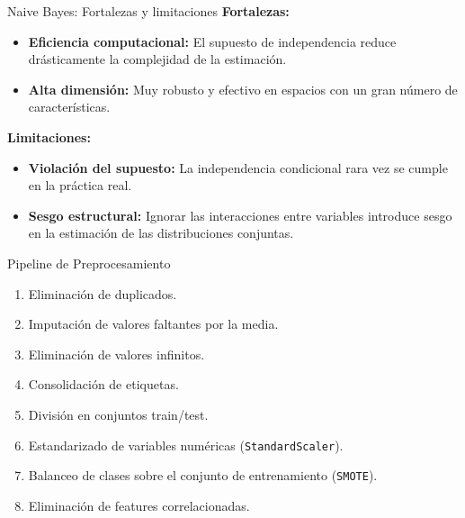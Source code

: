 \documentclass{beamer}
\begin{document}
\begin{frame}{Naive Bayes: Fortalezas y limitaciones}
    \textbf{Fortalezas:}
    \begin{itemize}
        \item \textbf{Eficiencia computacional:} El supuesto de independencia reduce drásticamente la complejidad de la estimación.
        
        \item \textbf{Alta dimensión:} Muy robusto y efectivo en espacios con un gran número de características.
    \end{itemize}
    
    \vspace{0.2cm}
    
    \textbf{Limitaciones:}
    \begin{itemize}
        \item \textbf{Violación del supuesto:} La independencia condicional rara vez se cumple en la práctica real.
        
        \item \textbf{Sesgo estructural:} Ignorar las interacciones entre variables introduce sesgo en la estimación de las distribuciones conjuntas.
    \end{itemize}
\end{frame}


\begin{frame}{Pipeline de Preprocesamiento}
    \begin{enumerate}
        \item Eliminación de duplicados.
        
        \item Imputación de valores faltantes por la media.
        
        \item Eliminación de valores infinitos.
        
        \item Consolidación de etiquetas.
        
        \item División en conjuntos train/test.
        
        \item Estandarizado de variables numéricas (\texttt{StandardScaler}).
        
        \item Balanceo de clases sobre el conjunto de entrenamiento (\texttt{SMOTE}).
        
        \item Eliminación de features correlacionadas.
    \end{enumerate}
\end{frame}
\end{document}
